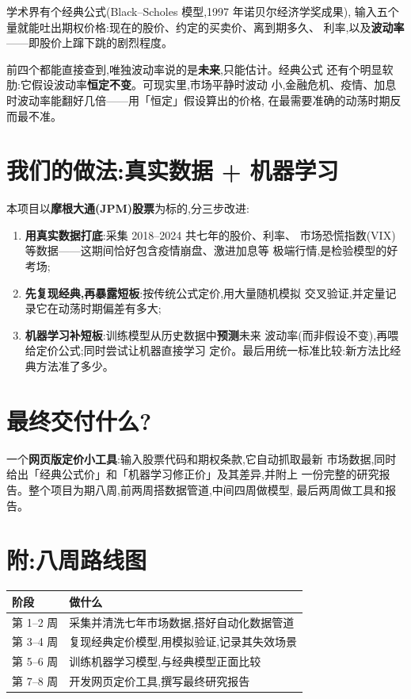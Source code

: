 \documentclass[11pt]{ctexart}
\begin{document}
学术界有个经典公式(Black--Scholes 模型,1997 年诺贝尔经济学奖成果),
输入五个量就能吐出期权价格:现在的股价、约定的买卖价、离到期多久、
利率,以及\textbf{波动率}——即股价上蹿下跳的剧烈程度。

前四个都能直接查到,唯独波动率说的是\textbf{未来},只能估计。经典公式
还有个明显软肋:它假设波动率\textbf{恒定不变}。可现实里,市场平静时波动
小,金融危机、疫情、加息时波动率能翻好几倍——用「恒定」假设算出的价格,
在最需要准确的动荡时期反而最不准。

\section{我们的做法:真实数据 + 机器学习}

本项目以\textbf{摩根大通(JPM)股票}为标的,分三步改进:

\begin{enumerate}
  \item \textbf{用真实数据打底}:采集 2018--2024 共七年的股价、利率、
        市场恐慌指数(VIX)等数据——这期间恰好包含疫情崩盘、激进加息等
        极端行情,是检验模型的好考场;
  \item \textbf{先复现经典,再暴露短板}:按传统公式定价,用大量随机模拟
        交叉验证,并定量记录它在动荡时期偏差有多大;
  \item \textbf{机器学习补短板}:训练模型从历史数据中\textbf{预测}未来
        波动率(而非假设不变),再喂给定价公式;同时尝试让机器直接学习
        定价。最后用统一标准比较:新方法比经典方法准了多少。
\end{enumerate}

\section{最终交付什么?}

一个\textbf{网页版定价小工具}:输入股票代码和期权条款,它自动抓取最新
市场数据,同时给出「经典公式价」和「机器学习修正价」及其差异,并附上
一份完整的研究报告。整个项目为期八周,前两周搭数据管道,中间四周做模型,
最后两周做工具和报告。

\section*{附:八周路线图}

\begin{center}
\small
\begin{tabular}{ll}
\toprule
\textbf{阶段} & \textbf{做什么} \\
\midrule
第 1--2 周 & 采集并清洗七年市场数据,搭好自动化数据管道 \\
第 3--4 周 & 复现经典定价模型,用模拟验证,记录其失效场景 \\
第 5--6 周 & 训练机器学习模型,与经典模型正面比较 \\
第 7--8 周 & 开发网页定价工具,撰写最终研究报告 \\
\bottomrule
\end{tabular}
\end{center}
\end{document}
